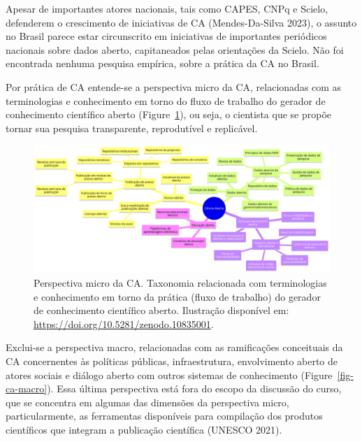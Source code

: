 \documentclass[
  a4paper,
]{article}
\begin{document}
Apesar de importantes atores nacionais, tais como CAPES, CNPq e Scielo,
defenderem o crescimento de iniciativas de CA (Mendes-Da-Silva 2023), o
assunto no Brasil parece estar circunscrito em iniciativas de
importantes periódicos nacionais sobre dados aberto, capitaneados pelas
orientações da Scielo. Não foi encontrada nenhuma pesquisa empírica,
sobre a prática da CA no Brasil.

Por prática de CA entende-se a perspectiva micro da CA, relacionadas com
as terminologias e conhecimento em torno do fluxo de trabalho do gerador
de conhecimento científico aberto (Figure~\ref{fig-ca-micro}), ou seja,
o cientista que se propõe tornar sua pesquisa transparente, reprodutível
e replicável.

\begin{figure}

\includegraphics{img/ca-micro.png}

\caption{\label{fig-ca-micro}Perspectiva micro da CA. Taxonomia
relacionada com terminologias e conhecimento em torno da prática (fluxo
de trabalho) do gerador de conhecimento científico aberto. Ilustração
disponível em: \url{https://doi.org/10.5281/zenodo.10835001}.}

\end{figure}%

Exclui-se a perspectiva macro, relacionadas com as ramificações
conceituais da CA concernentes às políticas públicas, infraestrutura,
envolvimento aberto de atores sociais e diálogo aberto com outros
sistemas de conhecimento (Figure~\ref{fig-ca-macro}). Essa última
perspectiva está fora do escopo da discussão do curso, que se concentra
em algumas das dimensões da perspectiva micro, particularmente, as
ferramentas disponíveis para compilação dos produtos científicos que
integram a publicação científica (UNESCO 2021).
\end{document}
